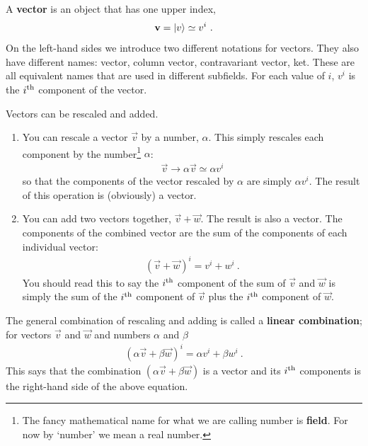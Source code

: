 A \textbf{vector} is an object that has one upper index,
\begin{align}
    \mathbf{v} = \left|v\right\rangle \simeq v^i \ .
\end{align}
On the left-hand sides we introduce two different notations for vectors. They also have different names: vector, column vector, contravariant vector, ket. These are all equivalent names that are used in different subfields. For each value of $i$, $v^i$ is the $i^\textnormal{th}$ component of the vector. 


\begin{newrule}\label{rule:vector:linear:combinations}
Vectors can be rescaled and added.
\begin{enumerate}
    \item You can rescale a vector $\vec{v}$ by a number, $\alpha$. This simply rescales each component by the number\footnote{The fancy mathematical name for what we are calling number is \textbf{field}. For now by `number' we mean a real number.} $\alpha$:
    \begin{align}
        \vec{v} \to \alpha\vec{v} \simeq \alpha v^i
    \end{align}
    so that the components of the vector rescaled by $\alpha$ are simply $\alpha v^i$. The result of this operation is (obviously) a vector.
    \item You can add two vectors together, $\vec{v} + \vec{w}$. The result is also a vector. The components of the combined vector are the sum of the components of each individual vector:
    \begin{align}
        (\vec{v}+\vec{w})^i = v^i + w^i \ . \label{eq:vector:addition:rulex}
    \end{align}
    You should read this to say the $i^\textnormal{th}$ component of the sum of $\vec{v}$ and $\vec{w}$ is simply the sum of the $i^\textnormal{th}$ component of $\vec{v}$ plus the $i^\textnormal{th}$ component of $\vec{w}$.
\end{enumerate}
The general combination of rescaling and adding is called a \textbf{linear combination}; for vectors $\vec{v}$ and $\vec{w}$ and numbers $\alpha$ and $\beta$
\begin{align}
    (\alpha \vec{v} + \beta\vec{w})^i = \alpha v^i + \beta w^i \ .
\end{align}
This says that the combination $(\alpha\vec{v}+\beta\vec{w})$ is a vector and its $i^\textnormal{th}$ components is the right-hand side of the above equation.
\end{newrule}

